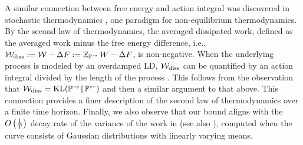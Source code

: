 A similar connection between free energy and action integral was discovered in stochastic thermodynamics \citep{sekimoto2010stochastic,seifert2012stochastic}, one paradigm for non-equilibrium thermodynamics. By the second law of thermodynamics, the averaged dissipated work, defined as the averaged work minus the free energy difference, i.e., $\mathcal{W}_\mathrm{diss}:=\mathcal{W}-\Delta F:=\operatorname{\mathbb{E}}_{\mathbb{P}^\to}W-\Delta F$, is non-negative. When the underlying process is modeled by an overdamped LD, $\mathcal{W}_\mathrm{diss}$ can be quantified by an action integral divided by the length of the process \citep{aurell2011optimal,chen2020stochastic}. This follows from the observation that $\mathcal{W}_\mathrm{diss}=\operatorname{KL}(\mathbb{P}^\to\|\mathbb{P}^\gets)$ and then a similar argument to that above. This connection provides a finer description of the second law of thermodynamics \citep{aurell2012refined} over a finite time horizon. Finally, we also observe that our bound aligns with the $O\left(\frac1T\right)$ decay rate of the variance of the work in \cite{mazonka1999exactly} (see also \citet[Chap. 4.1.4]{lelievre2010free}), computed when the curve consists of Gaussian distributions with linearly varying means.